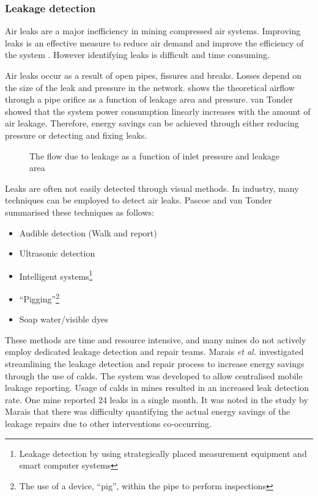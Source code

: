 		 \subsubsection{Leakage detection}	 
		 Air leaks are a major inefficiency in mining compressed air systems. Improving leaks is an effective measure to reduce air demand and improve the efficiency of the system \cite{van2011sustaining}. However identifying leaks is difficult and time consuming.
		 \par 
		  Air leaks occur as a result of open pipes, fissures and breaks. Losses depend on the size of the leak and pressure in the network.  shows the theoretical airflow through a pipe orifice as a function of leakage area and pressure\footnotemark[1]. van Tonder \cite{van2011sustaining} showed that the system power consumption linearly increases with the amount of air leakage. Therefore, energy savings can be achieved through either reducing pressure or detecting and fixing leaks.
		 \begin{figure}[!htbp]
		 	\centering
		 	\fbox{\hspace{2cm}\hspace{2cm}}
		 	\caption[The flow due to leakage as a function of inlet pressure and leakage area]{ The flow due to leakage as a function of inlet pressure and leakage area\protect\footnotemark[1]}
		 	\label{fig: Leak losses}
		 \end{figure}
	 \par 
		 Leaks are often not easily detected through visual methods. In industry, many techniques can be employed to detect air leaks. Pascoe \cite{Pascoe2016Masters} and van Tonder \cite{vanTonder2010Masters} summarised these techniques as follows:
		 \begin{itemize}
		 	\item Audible detection (Walk and report)
		 	\item Ultrasonic detection
		 	\item Intelligent systems\footnote{Leakage detection by using strategically placed measurement equipment and smart computer systems}
		 	\item \enquote{Pigging}\footnote{The use of a device, \enquote{pig}, within the pipe to perform inspections}
		 	\item Soap water/visible dyes 
		 \end{itemize}
	 	 These methods are time and resource intensive, and many mines do not actively employ dedicated leakage detection and repair teams. Marais \textit{et al.} \cite{marais2009increased} investigated streamlining the leakage detection and repair process to increase energy savings through the use of \gls{calds}. The system was developed to allow centralised mobile leakage reporting. Usage of \gls{calds} in mines resulted in an increased leak detection rate. One mine reported 24 leaks in a single month. It was noted in the study by Marais that there was difficulty quantifying the actual energy savings of the leakage repairs due to other interventions co-occurring.	
		 

